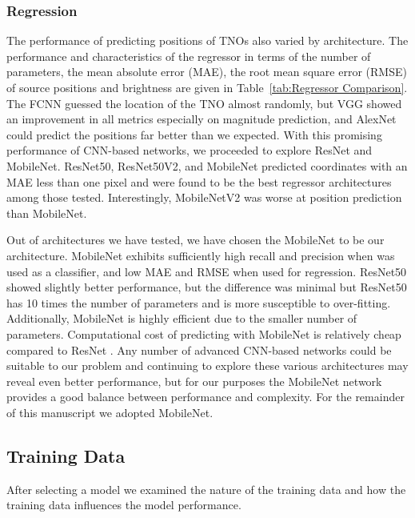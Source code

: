 \subsubsection{Regression} \label{subsubsect:FixedDataRgs}

The performance of predicting positions of TNOs also varied by architecture.
The performance and characteristics of the regressor in terms of the number of parameters, the mean absolute error (MAE), the root mean square error (RMSE) of source positions and brightness are given in Table~\ref{tab:Regressor Comparison}.
The FCNN guessed the location of the TNO almost randomly, but VGG showed an improvement in all metrics especially on magnitude prediction, and AlexNet could predict the positions far better than we expected.
With this promising performance of CNN-based networks, we proceeded to explore ResNet and MobileNet.
ResNet50, ResNet50V2, and MobileNet predicted coordinates with an MAE less than one pixel and were found to be the best regressor architectures among those tested.
Interestingly, MobileNetV2 was worse at position prediction than MobileNet.

Out of architectures we have tested, we have chosen the MobileNet to be our architecture. 
MobileNet exhibits sufficiently high recall and precision when was used as a classifier, and low MAE and RMSE when used for regression. 
ResNet50 showed slightly better performance, but the difference was minimal but ResNet50 has 10 times the number of parameters and is more susceptible to over-fitting.
Additionally, MobileNet is highly efficient due to the smaller number of parameters.
Computational cost of predicting with MobileNet is relatively cheap compared to ResNet \citep{2020arXiv201108367S}.
Any number of advanced CNN-based networks could be suitable to our problem and continuing to explore these various architectures may reveal even better performance, but for our purposes the MobileNet network provides a good balance between performance and complexity.
For the remainder of this manuscript we adopted MobileNet. 

 \subsection{Training Data}
 \label{subsect:FixedArch}
 
After selecting a model we examined the nature of the training data and how the training data influences the model performance.

